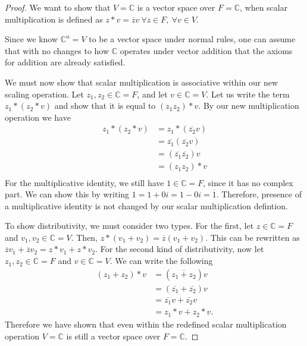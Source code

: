 \documentclass{article}
\begin{document}
\begin{proof}
We want to show that $V = \mathbb{C}$ is a vector space over $F = \mathbb{C}$, when scalar multiplication is defined as $z*v = \overline{z}v \ \forall{z} \in F, \ \forall{v} \in V$.

 Since we know $\mathbb{C}^n = V$ to be a vector space under normal rules, one can assume that with no changes to how $\mathbb{C}$ operates under vector addition that the axioms for addition are already satisfied.

We must now show that scalar multiplication is associative within our new scaling operation. Let $z_1, z_2 \in \mathbb{C} = F$, and let $v \in \mathbb{C} = V$. Let us write the term $z_1 * (z_2 * v)$ and show that it is equal to $(z_1 z_2) * v$. By our new multiplication operation we have 
\begin{align*} 
z_1 * (z_2 * v) & = z_1 * (\overline{z_2}v)\\
& = \overline{z_1} (\overline{z_2}v)\\
& = (\overline{z_1} \overline{z_2})v\\
& = (z_1 z_2) * v\\
\end{align*}
For the multiplicative identity, we still have $1 \in \mathbb{C} = F$, since it has no complex part. We can show this by writing $1 = 1 + 0i = 1 - 0i = \overline{1}$. Therefore, presence of a multiplicative identity is not changed by our scalar multiplication defintion.

To show distributivity, we must consider two types. For the first, let $z \in \mathbb{C}=F$ and $v_1, v_2 \in \mathbb{C}=V$. Then, $z *  (v_1 + v_2) = \overline{z} (v_1 + v_2)$. This can be rewritten as $\overline{z}v_1 + \overline{z}v_2 = z * v_1 + z * v_2$. For the second kind of distributivity, now let $z_1, z_2 \in \mathbb{C}=F$ and $v \in \mathbb{C}=V$. We can write the following 
\begin{align*}
(z_1 + z_2) * v & = (\overline{z_1 + z_2})v \\
& = (\overline{z_1} + \overline{z_2})v \\
& = \overline{z_1}v + \overline{z_2}v \\
& = z_1 * v + z_2 * v.
\end{align*}
Therefore we have shown that even within the redefined scalar multiplication operation $V = \mathbb{C}$ is still a vector space over $F = \mathbb{C}$.

\end{proof}
\end{document}
